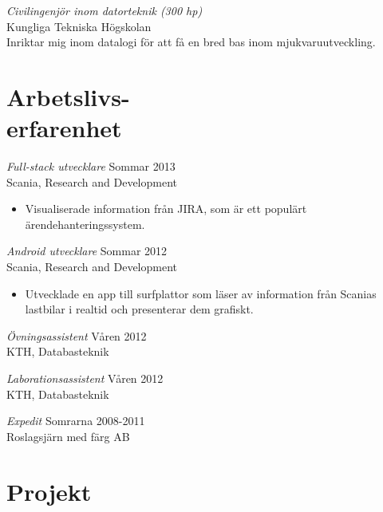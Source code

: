 \documentclass[margin, 10pt]{res} %
\begin{document}
\begin{resume}
{\sl Civilingenjör inom datorteknik (300 hp)} \\
Kungliga Tekniska Högskolan \\
Inriktar mig inom datalogi för att få en bred bas inom mjukvaruutveckling.

 
 
\section{Arbetslivs-\\erfarenhet}

{\sl Full-stack utvecklare} \hfill Sommar 2013 \\
Scania, Research and Development

\begin{itemize} \itemsep -2pt %
\item Visualiserade information från JIRA, som är ett populärt ärendehanteringssystem.
\end{itemize}	
 
{\sl Android utvecklare} \hfill Sommar 2012 \\
Scania, Research and Development
\begin{itemize} 
\item Utvecklade en app till surfplattor som läser av information från Scanias lastbilar i realtid och presenterar dem grafiskt.
\end{itemize} 

{\sl Övningsassistent} \hfill Våren 2012 \\
KTH, Databasteknik

{\sl Laborationsassistent} \hfill Våren 2012 \\
KTH, Databasteknik

{\sl Expedit} \hfill Somrarna 2008-2011 \\
Roslagsjärn med färg AB


\section{Projekt}


\end{resume}
\end{document}
